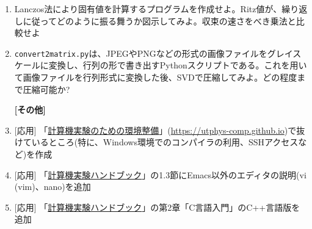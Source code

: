\documentclass[11pt]{jarticle}
\begin{document}
\begin{enumerate}
\item Lanczos法により固有値を計算するプログラムを作成せよ。Ritz値が、繰り返しに従ってどのように振る舞うか図示してみよ。収束の速さをべき乗法と比較せよ

\item {\tt convert2matrix.py}は、JPEGやPNGなどの形式の画像ファイルをグレイスケールに変換し、行列の形で書き出すPythonスクリプトである。これを用いて画像ファイルを行列形式に変換した後、SVDで圧縮してみよ。どの程度まで圧縮可能か?

  \hspace*{-2em} {\bf [その他]}

\item \mbox{} [応用] 「\href{https://utphys-comp.github.io}{計算機実験のための環境整備}」({\small \href{https://utphys-comp.github.io}{https://utphys-comp.github.io}})で抜けているところ(特に、Windows環境でのコンパイラの利用、SSHアクセスなど)を作成

\item \mbox{} [応用] 「\href{https://github.com/utphys-comp/handbook/releases/download/handbook-2019/handbook.pdf}{計算機実験ハンドブック}」の1.3節にEmacs以外のエディタの説明(vi (vim)、nano)を追加

\item \mbox{} [応用] 「\href{https://github.com/utphys-comp/handbook/releases/download/handbook-2019/handbook.pdf}{計算機実験ハンドブック}」の第2章「C言語入門」のC++言語版を追加

\end{enumerate}  
\end{document}
